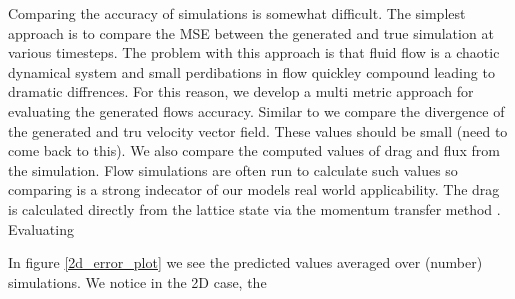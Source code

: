 \documentclass{article}
\begin{document}
Comparing the accuracy of simulations is somewhat difficult. The simplest approach is to compare the MSE between the generated and true simulation at various timesteps. The problem with this approach is that fluid flow is a chaotic dynamical system and small perdibations in flow quickley compound leading to dramatic diffrences. For this reason, we develop a multi metric approach for evaluating the generated flows accuracy. Similar to \cite{} we compare the divergence of the generated and tru velocity vector field. These values should be small (need to come back to this). We also compare the computed values of drag and flux from the simulation. Flow simulations are often run to calculate such values so comparing is a strong indecator of our models real world applicability. The drag is calculated directly from the lattice state via the momentum transfer method \cite{guo2013lattice}. Evaluating 

In figure \ref{2d_error_plot} we see the predicted values averaged over (number) simulations. We notice in the 2D case, the 
\end{document}
